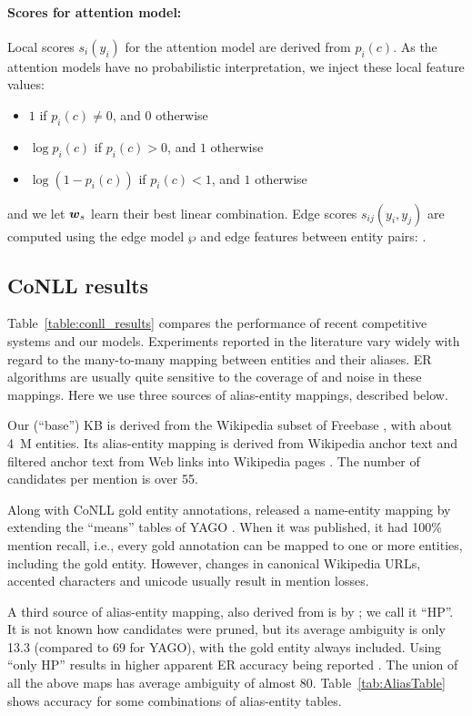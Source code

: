 \paragraph*{Scores for attention model:}
Local scores $s_i(y_i)$ for the attention model are derived from
$p_i(c)$.  As the attention models have no probabilistic
interpretation, we inject these local feature values:
\begin{itemize}
\item $1$ if $p_i(c)\ne 0$, and 0 otherwise
\item $\log p_i(c)$ if $p_i(c)>0$, and $1$ otherwise
\item $\log(1-p_i(c))$ if $p_i(c)<1$, and $1$ otherwise
\end{itemize}
and we let $\boldsymbol{w}_s$ learn their best linear combination.  Edge scores
$s_{ij}(y_i, y_j)$ are computed using the edge model $\wp$ and edge
features between entity pairs:
.


\subsection{CoNLL results}

Table~\ref{table:conll_results} compares the performance of recent
competitive systems and our models.  Experiments reported in the
literature vary widely with regard to the many-to-many mapping between
entities and their aliases.  ER algorithms are usually quite sensitive
to the coverage of and noise in these mappings.  Here we use three
sources of alias-entity mappings, described below.

Our (``base'') KB is derived from the Wikipedia
subset of Freebase , with about 4~M entities.
Its alias-entity mapping is derived from Wikipedia anchor text and
 filtered anchor text from Web links into Wikipedia pages
\cite{singh12:wiki-links}.  The number of candidates per mention is
over 55.

Along with CoNLL gold entity annotations,
 released a name-entity mapping by extending the
``means'' tables of YAGO \cite{hoffart2013yago2}.  When it was
published, it had 100\% mention recall, i.e., every gold annotation
can be mapped to one or more entities, including the gold entity.
However, changes in canonical Wikipedia URLs, accented characters and
unicode usually result in mention losses.

A third source of alias-entity mapping, also derived from
 is by ; we call it ``HP''.
It is not known how candidates were pruned, but its average ambiguity
is only 13.3 (compared to 69 for YAGO), with the gold entity always
included.  Using ``only HP'' results in higher apparent ER accuracy
being reported \cite{Pershina2015,YamadaS0T16}.  The union of all the
above maps has average ambiguity of almost 80.
Table~\ref{tab:AliasTable} shows accuracy for some combinations of
alias-entity tables.




